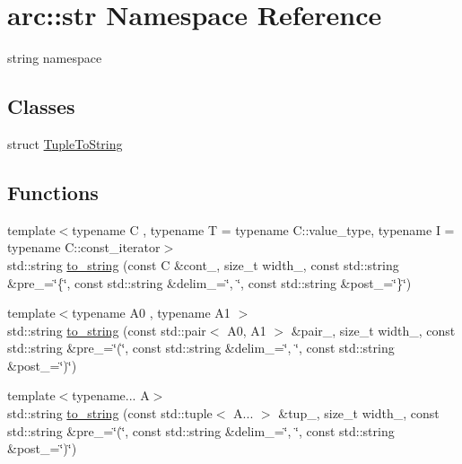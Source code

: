 \hypertarget{namespacearc_1_1str}{}\section{arc\+:\+:str Namespace Reference}
\label{namespacearc_1_1str}


string namespace  


\subsection*{Classes}
\begin{DoxyCompactItemize}
\item 
struct \mbox{\hyperlink{structarc_1_1str_1_1_tuple_to_string}{Tuple\+To\+String}}
\end{DoxyCompactItemize}
\subsection*{Functions}
\begin{DoxyCompactItemize}
\item 
{\footnotesize template$<$typename C , typename T  = typename C\+::value\+\_\+type, typename I  = typename C\+::const\+\_\+iterator$>$ }\\std\+::string \mbox{\hyperlink{namespacearc_1_1str_a53e4e5a084da03d5cc8ea2d4ee8ba7d0}{to\+\_\+string}} (const C \&cont\+\_\+, size\+\_\+t width\+\_, const std\+::string \&pre\+\_\+=\char`\"{}\{\char`\"{}, const std\+::string \&delim\+\_\+=\char`\"{}, \char`\"{}, const std\+::string \&post\+\_\+=\char`\"{}\}\char`\"{})
\item 
{\footnotesize template$<$typename A0 , typename A1 $>$ }\\std\+::string \mbox{\hyperlink{namespacearc_1_1str_a272000ff280c6447f036e80aeb3c3794}{to\+\_\+string}} (const std\+::pair$<$ A0, A1 $>$ \&pair\+\_\+, size\+\_\+t width\+\_, const std\+::string \&pre\+\_\+=\char`\"{}(\char`\"{}, const std\+::string \&delim\+\_\+=\char`\"{}, \char`\"{}, const std\+::string \&post\+\_\+=\char`\"{})\char`\"{})
\item 
{\footnotesize template$<$typename... A$>$ }\\std\+::string \mbox{\hyperlink{namespacearc_1_1str_ab73894966cf4d5672f5c86ba7a1a1465}{to\+\_\+string}} (const std\+::tuple$<$ A... $>$ \&tup\+\_\+, size\+\_\+t width\+\_, const std\+::string \&pre\+\_\+=\char`\"{}(\char`\"{}, const std\+::string \&delim\+\_\+=\char`\"{}, \char`\"{}, const std\+::string \&post\+\_\+=\char`\"{})\char`\"{})
\end{DoxyCompactItemize}


